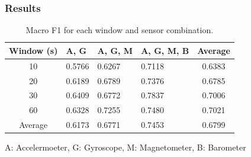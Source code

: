 \subsubsection{Results}

\begin{table}[htbp]
\centering
\caption{Macro F1 for each window and sensor combination.}
\label{tab:transfer-v2-run-f1}
\begin{threeparttable}
\begin{tabular}{|c|p{2cm}p{2cm}p{2cm}|c|}
\hline
\textbf{Window (s)}\tnote{1} & A, G & A, G, M & A, G, M, B & Average \\
\hline
10 & 0.5766 & 0.6267 & 0.7118 & 0.6383 \\
20 & 0.6189 & 0.6789 & 0.7376 & 0.6785 \\
30 & 0.6409 & 0.6772 & 0.7837 & 0.7006 \\
60 & 0.6328 & 0.7255 & 0.7480 & 0.7021 \\
\hline
Average & 0.6173 & 0.6771 & 0.7453 & 0.6799 \\
\hline
\end{tabular}
\begin{tablenotes}
\item[1] A: Accelermoeter, G: Gyroscope, M: Magnetometer, B: Barometer
\end{tablenotes}
\end{threeparttable}
\end{table}


